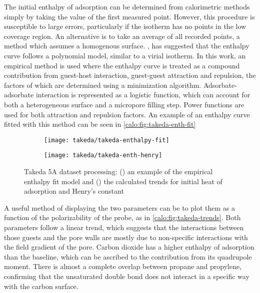 The initial enthalpy of adsorption can be determined from calorimetric 
methods simply by taking the value of the first measured point.
However, this procedure is susceptible to large errors, particularly
if the isotherm has no points in the low coverage region. An alternative
is to take an average of all recorded points, a method which assumes
a homogenous surface. \citet{myersThermodynamicsAdsorptionPorous2002},
has suggested that the enthalpy curve follows a polynomial model, similar
to a virial isotherm.
In this work, an empirical method is used where the enthalpy curve
is treated as a compound contribution from guest-host interaction,
guest-guest attraction and repulsion, the factors of which are determined
using a minimization algorithm. Adsorbate-adsorbate interaction is 
represented as a logistic function, which can account for both 
a heterogeneous surface and a micropore filling step. Power functions
are used for both attraction and repulsion factors. An example of 
an enthalpy curve fitted with this method can be seen 
in \autoref{calo:fig:takeda-enth-fit}

\begin{figure}[ht]

	\centering
	\begin{subfigure}[b]{.5\textwidth}
		\centering
		\texttt{[image: takeda/takeda-enthalpy-fit]}
		\caption{}%
		\label{calo:fig:takeda-enth-fit}
	\end{subfigure}%
	\begin{subfigure}[b]{.5\textwidth}
		\centering
		\texttt{[image: takeda/takeda-enth-henry]}
		\caption{}%
		\label{calo:fig:takeda-trends}
	\end{subfigure}
	\caption{Takeda 5A dataset processing: (\protect{})
	 an example of the empirical enthalpy fit model and (\protect{}) the calculated
		trends for initial heat of adsorption and Henry's constant}%
	\label{calo:fig:takeda-analysis}

\end{figure}

A useful method of displaying the two parameters can be to plot them
as a function of the polarizability of the probe, as in
\autoref{calo:fig:takeda-trends}. Both parameters follow a linear
trend, which suggests that the interactions between those guests and the
pore walls are mostly due to non-specific interactions with the field
gradient of the pore. Carbon dioxide has a higher enthalpy
of adsorption than the baseline, which can be ascribed to the contribution 
from its quadrupole moment. There is almost a complete overlap between 
propane and propylene, confirming that the unsaturated double bond does not
interact in a specific way with the carbon surface.


